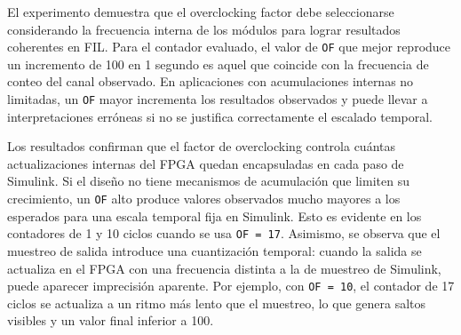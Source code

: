 El experimento demuestra que el overclocking factor debe seleccionarse considerando la frecuencia interna de los módulos para lograr resultados coherentes en FIL. Para el contador evaluado, el valor de \texttt{OF} que mejor reproduce un incremento de 100 en 1 segundo es aquel que coincide con la frecuencia de conteo del canal observado. En aplicaciones con acumulaciones internas no limitadas, un \texttt{OF} mayor incrementa los resultados observados y puede llevar a interpretaciones erróneas si no se justifica correctamente el escalado temporal.

Los resultados confirman que el factor de overclocking controla cuántas actualizaciones internas del FPGA quedan encapsuladas en cada paso de Simulink. Si el diseño no tiene mecanismos de acumulación que limiten su crecimiento, un \texttt{OF} alto produce valores observados mucho mayores a los esperados para una escala temporal fija en Simulink. Esto es evidente en los contadores de 1 y 10 ciclos cuando se usa \texttt{OF = 17}. Asimismo, se observa que el muestreo de salida introduce una cuantización temporal: cuando la salida se actualiza en el FPGA con una frecuencia distinta a la de muestreo de Simulink, puede aparecer imprecisión aparente. Por ejemplo, con \texttt{OF = 10}, el contador de 17 ciclos se actualiza a un ritmo más lento que el muestreo, lo que genera saltos visibles y un valor final inferior a 100.
